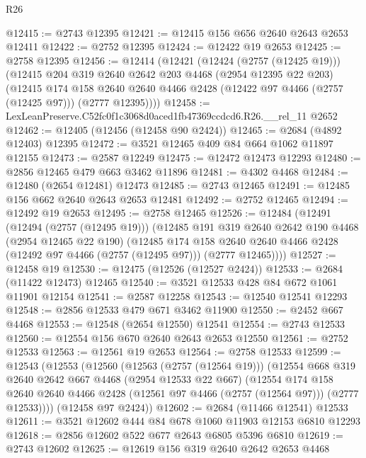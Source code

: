 \begin{lexlean}{R26}
\begin{coremodule}
@12415 := @2743 @12395
@12421 := @12415 @156 @656 @2640 @2643 @2653 @12411
@12422 := @2752 @12395
@12424 := @12422 @19 @2653
@12425 := @2758 @12395
@12456 := @12414
    (@12421
      (@12424 (@2757 (@12425 @19)))
      (@12415
        @204
        @319
        @2640
        @2642
        @203
        @4468
        (@2954 @12395 @22 @203)
        (@12415
          @174
          @158
          @2640
          @2640
          @4466
          @2428
          (@12422 @97 @4466 (@2757 (@12425 @97)))
          (@2777 @12395))))
@12458 := LexLeanPreserve.C52fc0f1c3068d0aced1fb47369ccdcd6.R26.__rel_11 @2652
@12462 := @12405 (@12456 (@12458 @90 @2424))
@12465 := @2684 (@4892 @12403) @12395
@12472 := @3521 @12465 @409 @84 @664 @1062 @11897 @12155
@12473 := @2587 @12249
@12475 := @12472 @12473 @12293
@12480 := @2856 @12465 @479 @663 @3462 @11896
@12481 := @4302 @4468
@12484 := @12480 (@2654 @12481) @12473
@12485 := @2743 @12465
@12491 := @12485 @156 @662 @2640 @2643 @2653 @12481
@12492 := @2752 @12465
@12494 := @12492 @19 @2653
@12495 := @2758 @12465
@12526 := @12484
    (@12491
      (@12494 (@2757 (@12495 @19)))
      (@12485
        @191
        @319
        @2640
        @2642
        @190
        @4468
        (@2954 @12465 @22 @190)
        (@12485
          @174
          @158
          @2640
          @2640
          @4466
          @2428
          (@12492 @97 @4466 (@2757 (@12495 @97)))
          (@2777 @12465))))
@12527 := @12458 @19
@12530 := @12475 (@12526 (@12527 @2424))
@12533 := @2684 (@11422 @12473) @12465
@12540 := @3521 @12533 @428 @84 @672 @1061 @11901 @12154
@12541 := @2587 @12258
@12543 := @12540 @12541 @12293
@12548 := @2856 @12533 @479 @671 @3462 @11900
@12550 := @2452 @667 @4468
@12553 := @12548 (@2654 @12550) @12541
@12554 := @2743 @12533
@12560 := @12554 @156 @670 @2640 @2643 @2653 @12550
@12561 := @2752 @12533
@12563 := @12561 @19 @2653
@12564 := @2758 @12533
@12599 := @12543
    (@12553
      (@12560
        (@12563 (@2757 (@12564 @19)))
        (@12554
          @668
          @319
          @2640
          @2642
          @667
          @4468
          (@2954 @12533 @22 @667)
          (@12554
            @174
            @158
            @2640
            @2640
            @4466
            @2428
            (@12561 @97 @4466 (@2757 (@12564 @97)))
            (@2777 @12533))))
      (@12458 @97 @2424))
@12602 := @2684 (@11466 @12541) @12533
@12611 := @3521 @12602 @444 @84 @678 @1060 @11903 @12153 @6810 @12293
@12618 := @2856 @12602 @522 @677 @2643 @6805 @5396 @6810
@12619 := @2743 @12602
@12625 := @12619 @156 @319 @2640 @2642 @2653 @4468

\end{coremodule}
\end{lexlean}
